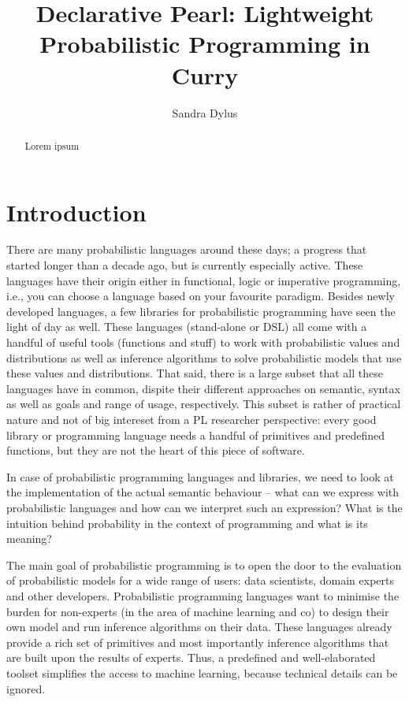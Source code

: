 \documentclass[
12pt, %
a4paper, %
oneside, %
]{llncs}
\title{Declarative Pearl: Lightweight Probabilistic Programming in Curry}
\author{Sandra Dylus}
\institute{Institut f\"ur Informatik, Christian-Albrechts-Universi\"at zu Kiel\\\email{sad@informatik.uni-kiel.de}}
\begin{document}
\maketitle

\begin{abstract}
  Lorem ipsum
\end{abstract}

\section{Introduction}
There are many probabilistic languages around these days; a progress
that started longer than a decade ago, but is currently especially
active. %
These languages have their origin either in functional, logic or
imperative programming, i.e., you can choose a language based on your
favourite paradigm. %
Besides newly developed languages, a few libraries for probabilistic
programming have seen the light of day as well. %
These languages (stand-alone or DSL) all come with a handful of
useful tools (functions and stuff) to work with probabilistic values
and distributions as well as inference algorithms to solve
probabilistic models that use these values and distributions. %
That said, there is a large subset that all these languages have in
common, dispite their different approaches on semantic, syntax as well
as goals and range of usage, respectively. %
This subset is rather of practical nature and not of big intereset
from a PL researcher perspective: every good library or programming
language needs a handful of primitives and predefined functions, but
they are not the heart of this piece of software. %

In case of probabilistic programming languages and libraries, we need
to look at the implementation of the actual semantic behaviour -- what
can we express with probabilistic languages and how can we interpret
such an expression? %
What is the intuition behind probability in the context of programming
and what is its meaning? %

The main goal of probabilistic programming is to open the door to the
evaluation of probabilistic models for a wide range of users: data
scientists, domain experts and other developers. %
Probabilistic programming languages want to minimise the burden for
non-experts (in the area of machine learning and co) to design their
own model and run inference algorithms on their data. %
These languages already provide a rich set of primitives and most
importantly inference algorithms that are built upon the results of
experts. %
Thus, a predefined and well-elaborated toolset simplifies the access
to machine learning, because technical details can be ignored. %
\end{document}
